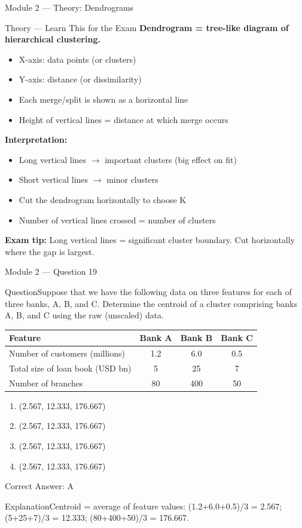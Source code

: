 \documentclass[aspectratio=169,10pt]{beamer}
\newcommand{\question}[1]{\begin{block}{Question}#1\end{block}}
\newcommand{\options}[4]{%
	\begin{enumerate}[label=\Alph*.,leftmargin=*]
		\item #1
		\item #2
		\item #3
		\item #4
	\end{enumerate}
}
\newcommand{\answerbox}[1]{\begin{exampleblock}{Correct Answer: #1}\end{exampleblock}}
\newcommand{\explain}[1]{\begin{block}{Explanation}#1\end{block}}
\newcommand{\theory}[1]{%
	\begin{block}{Theory --- Learn This for the Exam}
		\small #1
	\end{block}
}
\begin{document}
	\begin{frame}{Module 2 --- Theory: Dendrograms}
		\theory{
			\textbf{Dendrogram = tree-like diagram of hierarchical clustering.}
			\begin{itemize}
				\item X-axis: data points (or clusters)
				\item Y-axis: distance (or dissimilarity)
				\item Each merge/split is shown as a horizontal line
				\item Height of vertical lines = distance at which merge occurs
			\end{itemize}
			\textbf{Interpretation:}
			\begin{itemize}
				\item Long vertical lines $\rightarrow$ important clusters (big effect on fit)
				\item Short vertical lines $\rightarrow$ minor clusters
				\item Cut the dendrogram horizontally to choose K
				\item Number of vertical lines crossed = number of clusters
			\end{itemize}
			\textbf{Exam tip:} Long vertical lines = significant cluster boundary. Cut horizontally where the gap is largest.
		}
	\end{frame}
	
	\begin{frame}{Module 2 --- Question 19}
		\question{Suppose that we have the following data on three features for each of three banks, A, B, and C. Determine the centroid of a cluster comprising banks A, B, and C using the raw (unscaled) data.}
		\begin{center}
			\small
			\begin{tabular}{@{}lccc@{}}
				\toprule
				Feature & Bank A & Bank B & Bank C \\
				\midrule
				Number of customers (millions) & 1.2 & 6.0 & 0.5 \\
				Total size of loan book (USD bn) & 5 & 25 & 7 \\
				Number of branches & 80 & 400 & 50 \\
				\bottomrule
			\end{tabular}
		\end{center}
		\options{(2.567, 12.333, 176.667)}{(2.567, 12.333, 176.667)}{(2.567, 12.333, 176.667)}{(2.567, 12.333, 176.667)}
		\answerbox{A}
		\explain{Centroid = average of feature values: (1.2+6.0+0.5)/3 = 2.567; (5+25+7)/3 = 12.333; (80+400+50)/3 = 176.667.}
	\end{frame}
	
\end{document}
